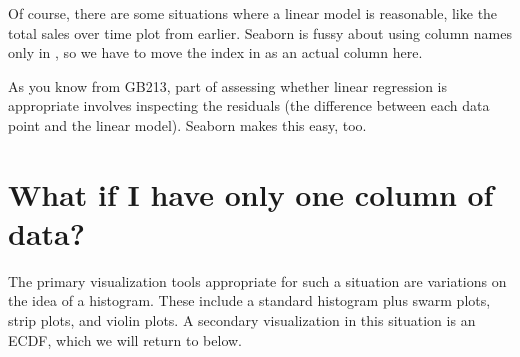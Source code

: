 \documentclass[letterpaper,10pt,english]{sphinxmanual}
\begin{document}
Of course, there are some situations where a linear model is reasonable, like the total sales over time plot from earlier.  Seaborn is fussy about using column names only in , so we have to move the index in as an actual column here.

\begin{sphinxVerbatim}[commandchars=\\\{\}]
\PYG{p}{[}\PYG{p}{]}  
    
 
               
\end{sphinxVerbatim}

\noindent{}

As you know from GB213, part of assessing whether linear regression is appropriate involves inspecting the residuals (the difference between each data point and the linear model).  Seaborn makes this easy, too.

\begin{sphinxVerbatim}[commandchars=\\\{\}]
    
  
\end{sphinxVerbatim}

\noindent{}


\section{What if I have only one column of data?}
\label{\detokenize{chapter-10-visualization:what-if-i-have-only-one-column-of-data}}
The primary visualization tools appropriate for such a situation are variations on the idea of a histogram.  These include a standard histogram plus swarm plots, strip plots, and violin plots.  A secondary visualization in this situation is an ECDF, which we will return to below.
\end{document}
